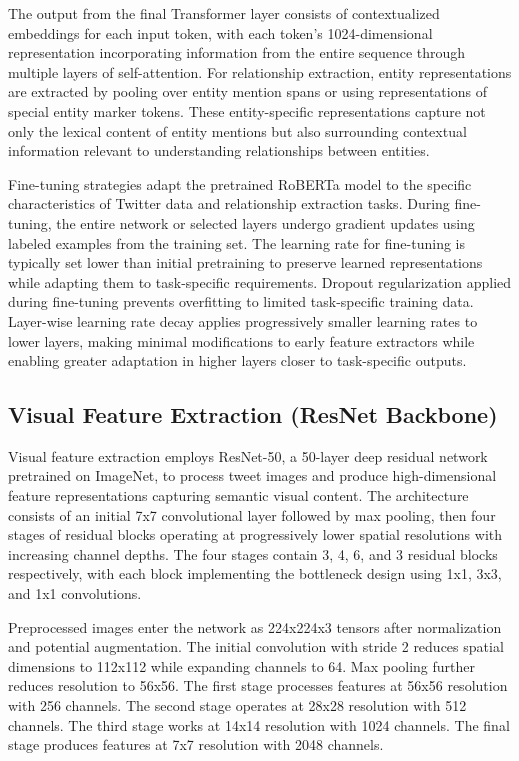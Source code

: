 \documentclass[12pt,a4paper]{report}
\begin{document}
The output from the final Transformer layer consists of contextualized embeddings for each input token, with each token's 1024-dimensional representation incorporating information from the entire sequence through multiple layers of self-attention. For relationship extraction, entity representations are extracted by pooling over entity mention spans or using representations of special entity marker tokens. These entity-specific representations capture not only the lexical content of entity mentions but also surrounding contextual information relevant to understanding relationships between entities.

Fine-tuning strategies adapt the pretrained RoBERTa model to the specific characteristics of Twitter data and relationship extraction tasks. During fine-tuning, the entire network or selected layers undergo gradient updates using labeled examples from the training set. The learning rate for fine-tuning is typically set lower than initial pretraining to preserve learned representations while adapting them to task-specific requirements. Dropout regularization applied during fine-tuning prevents overfitting to limited task-specific training data. Layer-wise learning rate decay applies progressively smaller learning rates to lower layers, making minimal modifications to early feature extractors while enabling greater adaptation in higher layers closer to task-specific outputs.

\subsection{Visual Feature Extraction (ResNet Backbone)}

Visual feature extraction employs ResNet-50, a 50-layer deep residual network pretrained on ImageNet, to process tweet images and produce high-dimensional feature representations capturing semantic visual content. The architecture consists of an initial 7x7 convolutional layer followed by max pooling, then four stages of residual blocks operating at progressively lower spatial resolutions with increasing channel depths. The four stages contain 3, 4, 6, and 3 residual blocks respectively, with each block implementing the bottleneck design using 1x1, 3x3, and 1x1 convolutions.

Preprocessed images enter the network as 224x224x3 tensors after normalization and potential augmentation. The initial convolution with stride 2 reduces spatial dimensions to 112x112 while expanding channels to 64. Max pooling further reduces resolution to 56x56. The first stage processes features at 56x56 resolution with 256 channels. The second stage operates at 28x28 resolution with 512 channels. The third stage works at 14x14 resolution with 1024 channels. The final stage produces features at 7x7 resolution with 2048 channels.
\end{document}
